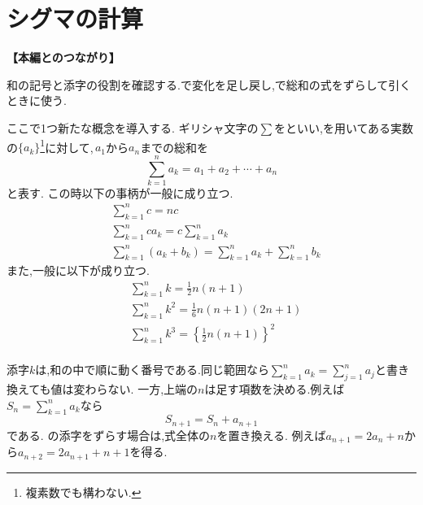 
\section{シグマの計算}\label{節：シグマの計算}
  \noindent\textbf{【本編とのつながり】}\par
  和の記号と添字の役割を確認する.で変化を足し戻し,で総和の式をずらして引くときに使う.

  ここで1つ新たな概念を導入する.
  ギリシャ文字の$\sum$をといい,を用いてある実数の$\{a_k\}$\footnote{複素数でも構わない.}に対して,\,$a_1$から$a_n$までの総和を
  \[
    \sum_{k=1}^{n} a_k=a_1+a_2+\cdots+ a_n
  \]
  と表す.
  この時以下の事柄が一般に成り立つ.
  \begin{align*}
    &\sum_{k=1}^{n} c=nc\\
    &\sum_{k=1}^{n} ca_k=c\sum_{k=1}^{n} a_k\\
    &\sum_{k=1}^{n} (a_k+b_k)=\sum_{k=1}^{n} a_k+\sum_{k=1}^{n} b_k
  \end{align*}
  また,一般に以下が成り立つ.
  \begin{align*}
    &\sum_{k=1}^{n} k=\frac{1}{2}n(n+1)\\
    &\sum_{k=1}^{n} k^2=\frac{1}{6}n(n+1)(2n+1)\\
    &\sum_{k=1}^{n} k^3=\left\{\frac{1}{2}n(n+1)\right\}^2\\
  \end{align*}

  添字$k$は,和の中で順に動く番号である.同じ範囲なら$\sum_{k=1}^{n}a_k=\sum_{j=1}^{n}a_j$と書き換えても値は変わらない.
  一方,上端の$n$は足す項数を決める.例えば$S_n=\sum_{k=1}^{n}a_k$なら
  \[
    S_{n+1}=S_n+a_{n+1}
  \]
  である.
  の添字をずらす場合は,式全体の$n$を置き換える.
  例えば$a_{n+1}=2a_n+n$から$a_{n+2}=2a_{n+1}+n+1$を得る.
